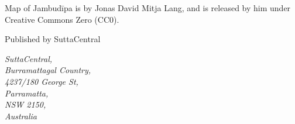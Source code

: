 \begin{footnotesize}
\medskip

Map of Jambudīpa is by Jonas David Mitja Lang, and is released by him under Creative Commons Zero (CC0).

\medskip

Published by SuttaCentral

\medskip

\textit{SuttaCentral,\\
Burramattagal Country,\\
4237/180 George St,\\
Parramatta,\\
NSW 2150,\\
Australia}

\end{footnotesize}

\newpage

\setlength{\parindent}{1em}%
